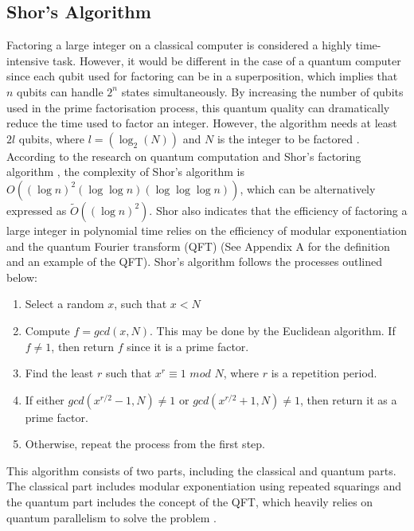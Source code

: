 \documentclass[12pt]{third-rep}
\begin{document}
\subsection{Shor's Algorithm}
Factoring a large integer on a classical computer is considered a highly time-intensive task. However, it would be different in the case of a quantum computer since each qubit used for factoring can be in a superposition, which implies that $n$ qubits can handle $2^n$ states simultaneously.  By increasing the number of qubits used in the prime factorisation process, this quantum quality can dramatically reduce the time used to factor an integer. However, the algorithm needs at least $2l$ qubits, where $l=(\log_2 (N))$ and $N$ is the integer to be factored \cite{shanghai}. According to the research on quantum computation and Shor's factoring algorithm \cite{cwi}, the complexity of Shor's algorithm is $O((\log n)^2(\log\log n)(\log\log\log n))$, which can be alternatively expressed as ${\tilde O}((\log n)^2)$. Shor also indicates that the efficiency of factoring a large integer in polynomial time relies on the efficiency of modular exponentiation and the quantum Fourier transform (QFT) (See Appendix A for the definition and an example of the QFT). Shor's algorithm follows the processes outlined below:
\begin{enumerate}
\item Select a random $x$, such that $x < N$
\item Compute $f = gcd(x,N)$. This may be done by the Euclidean algorithm. If $f\neq1$, then return $f$ since it is a prime factor.
\item Find the least $r$ such that $x^r\equiv1$ $mod$ $N$, where $r$ is a repetition period.
\item If either $gcd(x^{r/2}-1,N)\neq1$ or $gcd(x^{r/2}+1,N)\neq1$, then return it as a prime factor.
\item Otherwise, repeat the process from the first step.
\end{enumerate}
This algorithm consists of two parts, including the classical and quantum parts. The classical part includes modular exponentiation using repeated squarings and the quantum part includes the concept of the QFT, which heavily relies on quantum parallelism to solve the problem \cite{mcgill}. 
\end{document}
